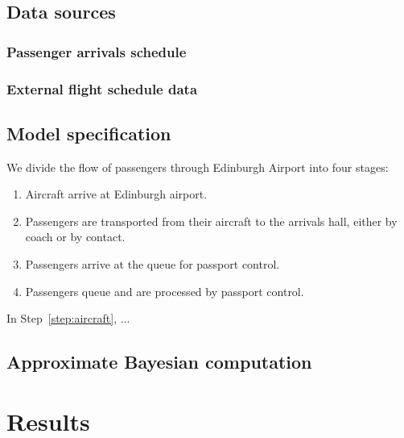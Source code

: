 \documentclass[12pt]{article}
\begin{document}
% 


\subsection{Data sources}
\subsubsection{Passenger arrivals schedule}
\subsubsection{External flight schedule data}
\subsection{Model specification}
We divide the flow of passengers through Edinburgh Airport into four stages:

\begin{enumerate}
    \item Aircraft arrive at Edinburgh airport. \label{step:aircraft}
    \item Passengers are transported from their aircraft to the arrivals hall, either by coach or by contact. \label{step:transport}
    \item Passengers arrive at the queue for passport control. \label{step:arrival}
    \item Passengers queue and are processed by passport control. \label{step:queue}
\end{enumerate}
In Step~\ref{step:aircraft}, ...
\subsection{Approximate Bayesian computation}

\section{Results}

\end{document}
